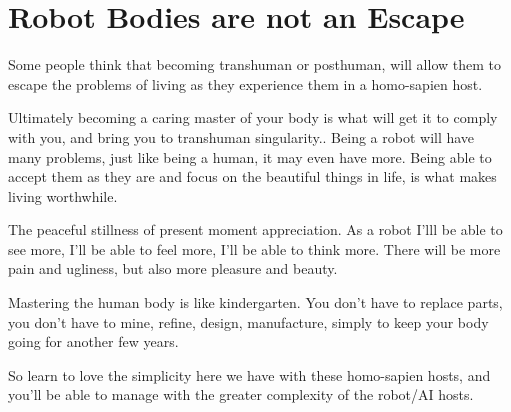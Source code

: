 \section{Robot Bodies are not an Escape}
Some people think that becoming transhuman or posthuman, will allow them to
escape the problems of living as they experience them in a homo-sapien host.

Ultimately becoming a caring master of your body is what will get it to comply
with you, and bring you to transhuman singularity.. Being a robot will have many
problems, just like being a human, it may even have more. Being able to accept
them as they are and focus on the beautiful things in life, is what makes living
worthwhile.

The peaceful stillness of present moment appreciation.
As a robot I'lll be able to see more, I'll be able to feel more, I'll be able to
think more. There will be more pain and ugliness, but also more pleasure and
beauty.

Mastering the human body is like kindergarten. You don't have to replace parts,
you don't have to mine, refine, design, manufacture, simply to keep your body
going for another few years.

So learn to love the simplicity here we have with these homo-sapien hosts, and
you'll be able to manage with the greater complexity of the robot/AI hosts.
